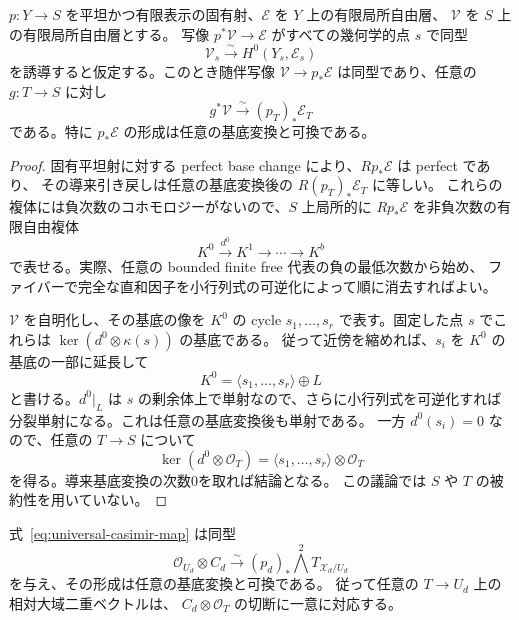\begin{lemma}[一様な切断による基底変換]
\label{lemma:universal-sections-base-change}
$p:Y\to S$ を平坦かつ有限表示の固有射、$\mathcal E$ を $Y$ 上の有限局所自由層、
$\mathcal V$ を $S$ 上の有限局所自由層とする。
写像 $p^*\mathcal V\to\mathcal E$ がすべての幾何学的点 $s$ で同型
\[
 \mathcal V_s\xrightarrow{\sim}H^0(Y_s,\mathcal E_s)
\]
を誘導すると仮定する。このとき随伴写像
$\mathcal V\to p_*\mathcal E$ は同型であり、任意の $g:T\to S$ に対し
\[
 g^*\mathcal V\xrightarrow{\sim}(p_T)_*\mathcal E_T
\]
である。特に $p_*\mathcal E$ の形成は任意の基底変換と可換である。
\end{lemma}

\begin{proof}
固有平坦射に対する perfect base change
\cite[Tag 0B91]{StacksProject} により、$Rp_*\mathcal E$ は perfect であり、
その導来引き戻しは任意の基底変換後の $R(p_T)_*\mathcal E_T$ に等しい。
これらの複体には負次数のコホモロジーがないので、$S$ 上局所的に
$Rp_*\mathcal E$ を非負次数の有限自由複体
\[
 K^0\xrightarrow{d^0}K^1\longrightarrow\cdots\longrightarrow K^b
\]
で表せる。実際、任意の bounded finite free 代表の負の最低次数から始め、
ファイバーで完全な直和因子を小行列式の可逆化によって順に消去すればよい。

$\mathcal V$ を自明化し、その基底の像を $K^0$ の cycle
$s_1,\ldots,s_r$ で表す。固定した点 $s$ でこれらは
$\ker(d^0\otimes\kappa(s))$ の基底である。
従って近傍を縮めれば、$s_i$ を $K^0$ の基底の一部に延長して
\[
 K^0=\langle s_1,\ldots,s_r\rangle\oplus L
\]
と書ける。$d^0|_L$ は $s$ の剰余体上で単射なので、さらに小行列式を可逆化すれば
分裂単射になる。これは任意の基底変換後も単射である。
一方 $d^0(s_i)=0$ なので、任意の $T\to S$ について
\[
 \ker(d^0\otimes\mathcal O_T)
 =\langle s_1,\ldots,s_r\rangle\otimes\mathcal O_T
\]
を得る。導来基底変換の次数0を取れば結論となる。
この議論では $S$ や $T$ の被約性を用いていない。
\end{proof}

\begin{proposition}[相対二重ベクトル束]
\label{prop:relative-bivectors}
式~\eqref{eq:universal-casimir-map} は同型
\begin{equation}
 \mathcal O_{U_d}\otimes C_d
 \xrightarrow{\sim}(p_d)_*\bigwedge^2T_{\mathcal X_d/U_d}
 \label{eq:relative-bivector-bundle}
\end{equation}
を与え、その形成は任意の基底変換と可換である。
従って任意の $T\to U_d$ 上の相対大域二重ベクトルは、
$C_d\otimes\mathcal O_T$ の切断に一意に対応する。
\end{proposition}

